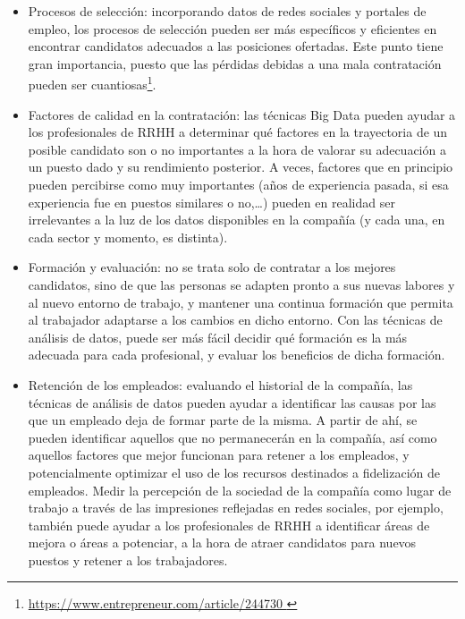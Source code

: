 \begin{itemize}
\item \label{item:puntodeproyecto} Procesos de selección: incorporando datos de redes sociales y portales de empleo,
los procesos de selección pueden ser más específicos y eficientes en encontrar candidatos 
adecuados a las posiciones ofertadas. Este punto tiene gran importancia, puesto que
las pérdidas debidas a una mala contratación pueden ser cuantiosas\footnote{\url{https://www.entrepreneur.com/article/244730 }}.
\label{item:puntodeproyecto}

\item Factores de calidad en la contratación: las técnicas Big Data pueden ayudar a los profesionales de
RRHH a determinar qué factores en la trayectoria de un posible candidato son o no importantes a 
la hora de valorar su adecuación a un puesto dado y su rendimiento posterior. A veces, factores que
en principio pueden percibirse como muy importantes (años de experiencia pasada, si esa experiencia fue
en puestos similares o no,\dots) pueden en realidad ser irrelevantes a la luz de los datos disponibles
en la compañía (y cada una, en cada sector y momento, es distinta).

\item Formación y evaluación: no se trata solo de contratar a los mejores candidatos, sino
de que las personas se adapten pronto a sus nuevas labores y al nuevo entorno de trabajo,
y mantener una continua formación que permita al trabajador adaptarse a los cambios en dicho
entorno. Con las técnicas de análisis de datos, puede ser más fácil decidir qué formación es 
la más adecuada para cada profesional, y evaluar los beneficios de dicha formación.

\item Retención de los empleados: evaluando el historial de la compañía,
las técnicas de análisis de datos pueden ayudar a identificar las causas por las que un empleado
deja de formar parte de la misma. A partir de ahí, se pueden identificar aquellos que no 
permanecerán en la compañía, así como aquellos factores que mejor funcionan para retener a los empleados,
y potencialmente optimizar el uso de los recursos destinados a fidelización de empleados. 
Medir la percepción de la sociedad de la compañía como lugar de trabajo a través de las impresiones
reflejadas en redes sociales, por ejemplo, también puede ayudar a los profesionales de RRHH a
identificar áreas de mejora o áreas a potenciar,
a la hora de atraer candidatos para nuevos puestos y retener a los trabajadores.


\end{itemize}
